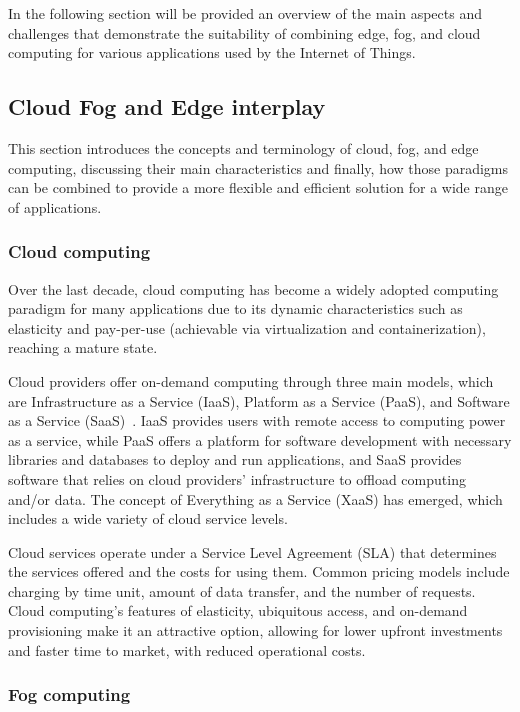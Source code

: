 In the following section will be provided an overview of the main aspects and challenges that demonstrate the suitability of combining edge, fog,
and cloud computing for various applications used by the Internet of Things.

\subsection{Cloud Fog and Edge interplay}
\label{sec:cloud-fog-edge-interplay}

This section introduces the concepts and terminology of cloud, fog, and edge computing, discussing their main characteristics and finally, how
those paradigms can be combined to provide a more flexible and efficient solution for a wide range of applications.

\subsubsection{Cloud computing}

Over the last decade, cloud computing has become a widely adopted computing paradigm for many applications due to its dynamic characteristics such as elasticity and pay-per-use (achievable via virtualization and containerization), reaching a mature state.

Cloud providers offer on-demand computing through three main models, which are Infrastructure as a Service (IaaS), Platform as a Service (PaaS), and
Software as a Service (SaaS)~\cite{armbrust2010view}. IaaS provides users with remote access to computing power as a service, while PaaS offers a
platform for software development with necessary libraries and databases to deploy and run applications, and SaaS provides software that relies on
cloud providers' infrastructure to offload computing and/or data. The concept of Everything as a Service (XaaS) has emerged, which
includes a wide variety of cloud service levels.

Cloud services operate under a Service Level Agreement (SLA) that determines the services offered and the costs for using them. Common pricing models
include charging by time unit, amount of data transfer, and the number of requests. Cloud computing's features of elasticity, ubiquitous access, and
on-demand provisioning make it an attractive option, allowing for lower upfront investments and faster time to market, with reduced
operational costs.

\subsubsection{Fog computing}

